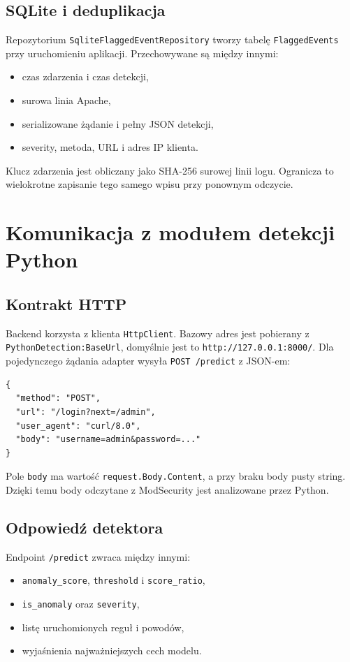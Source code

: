 \documentclass[12pt,a4paper]{article}
\newcommand{\code}[1]{\texttt{#1}}
\begin{document}
\subsection{SQLite i deduplikacja}

Repozytorium \code{SqliteFlaggedEventRepository} tworzy tabelę
\code{FlaggedEvents} przy uruchomieniu aplikacji. Przechowywane są między innymi:
\begin{itemize}
    \item czas zdarzenia i czas detekcji,
    \item surowa linia Apache,
    \item serializowane żądanie i pełny JSON detekcji,
    \item severity, metoda, URL i adres IP klienta.
\end{itemize}

Klucz zdarzenia jest obliczany jako SHA-256 surowej linii logu. Ogranicza to
wielokrotne zapisanie tego samego wpisu przy ponownym odczycie.

\section{Komunikacja z modułem detekcji Python}

\subsection{Kontrakt HTTP}

Backend korzysta z klienta \code{HttpClient}. Bazowy adres jest pobierany z
\code{PythonDetection:BaseUrl}, domyślnie jest to \code{http://127.0.0.1:8000/}.
Dla pojedynczego żądania adapter wysyła \code{POST /predict} z JSON-em:

\begin{lstlisting}
{
  "method": "POST",
  "url": "/login?next=/admin",
  "user_agent": "curl/8.0",
  "body": "username=admin&password=..."
}
\end{lstlisting}

Pole \code{body} ma wartość \code{request.Body.Content}, a przy braku body pusty
string. Dzięki temu body odczytane z ModSecurity jest analizowane przez Python.

\subsection{Odpowiedź detektora}

Endpoint \code{/predict} zwraca między innymi:
\begin{itemize}
    \item \code{anomaly\_score}, \code{threshold} i \code{score\_ratio},
    \item \code{is\_anomaly} oraz \code{severity},
    \item listę uruchomionych reguł i powodów,
    \item wyjaśnienia najważniejszych cech modelu.
\end{itemize}
\end{document}
